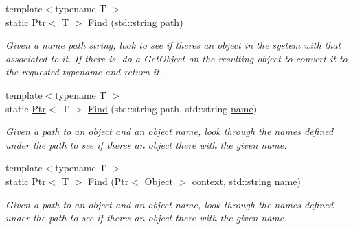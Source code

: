 \begin{DoxyCompactItemize}
{\footnotesize template$<$typename T $>$ }\\static \hyperlink{classns3_1_1Ptr}{Ptr}$<$ T $>$ \hyperlink{classns3_1_1Names_a9d07094fb3d716d08733af05c1593555}{Find} (std\+::string path)
\begin{DoxyCompactList}\small\item\em Given a name path string, look to see if there\textquotesingle{}s an object in the system with that associated to it. If there is, do a Get\+Object on the resulting object to convert it to the requested typename and return it. \end{DoxyCompactList}\item 
{\footnotesize template$<$typename T $>$ }\\static \hyperlink{classns3_1_1Ptr}{Ptr}$<$ T $>$ \hyperlink{classns3_1_1Names_a5d9baba3c4fe189b9e2c493df9e70697}{Find} (std\+::string path, std\+::string \hyperlink{generate__test__data__lte__spectrum__model_8m_ab74e6bf80237ddc4109968cedc58c151}{name})
\begin{DoxyCompactList}\small\item\em Given a path to an object and an object name, look through the names defined under the path to see if there\textquotesingle{}s an object there with the given name. \end{DoxyCompactList}\item 
{\footnotesize template$<$typename T $>$ }\\static \hyperlink{classns3_1_1Ptr}{Ptr}$<$ T $>$ \hyperlink{classns3_1_1Names_a7d2851cf2c04306722f838f37430d93f}{Find} (\hyperlink{classns3_1_1Ptr}{Ptr}$<$ \hyperlink{classns3_1_1Object}{Object} $>$ context, std\+::string \hyperlink{generate__test__data__lte__spectrum__model_8m_ab74e6bf80237ddc4109968cedc58c151}{name})
\begin{DoxyCompactList}\small\item\em Given a path to an object and an object name, look through the names defined under the path to see if there\textquotesingle{}s an object there with the given name. \end{DoxyCompactList}\end{DoxyCompactItemize}
